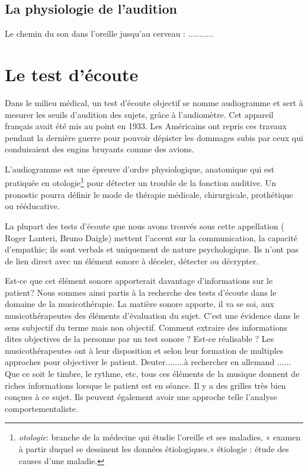 \section{La physiologie de l'audition}
Le chemin du son dans l'oreille jusqu'au cerveau : ...........
\chapter{Le test d'écoute}
Dans le milieu médical, un test d'écoute objectif se nomme audiogramme et
sert à mesurer les seuils d'audition des sujets, grâce à l'audiomètre. Cet 
appareil français avait été mis au point en 1933. Les Américains
ont repris ces travaux pendant la dernière guerre pour pouvoir dépister
les dommages subis par ceux qui conduisaient des engins bruyants comme
des avions.

L'audiogramme est une épreuve d'ordre physiologique, anatomique qui
est pratiquée en otologie\footnote{\emph{otologie}: branche de la médecine
  qui étudie l'oreille et ses maladies, « examen à partir duquel se
  dessinent les données étiologiques.» étiologie : étude des causes
  d'une maladie.} pour détecter un trouble de la fonction auditive. Un pronostic pourra définir le mode de thérapie
médicale, chirurgicale, prothétique ou rééducative.


La plupart des tests d'écoute que nous avons trouvés sous cette appellation
( Roger Lanteri, Bruno Daigle)
mettent l'accent sur la communication, la capacité d'empathie; ils sont verbals et uniquement  de nature  psychologique. Ils n'ont pas de lien direct avec un élément sonore à déceler,  détecter ou décrypter. 

Est-ce que cet élément sonore apporterait davantage d'informations sur
le patient? Nous sommes ainsi partis à la recherche  des tests d'écoute dans le domaine de la musicothérapie.
La matière sonore apporte, il va se soi, aux musicothérapeutes des éléments
 d'évaluation du sujet. C'est une évidence dans le sens subjectif du terme mais non objectif. Comment extraire des informations dites objectives de la personne par un test sonore ? Est-ce réalisable ?
 Les musicothérapeutes ont à leur disposition et selon leur formation de multiples approches pour objectiver le patient. Deuter........à rechercher en allemand ...... Que ce soit le timbre, le rythme, etc, tous ces éléments de la musique donnent de riches informations lorsque le patient est en séance. Il y a des grilles très bien conçues à ce sujet.
 Ils peuvent également avoir une approche telle l'analyse comportementaliste. 
 

